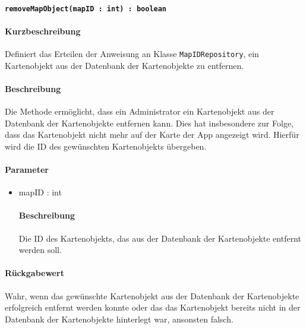 \paragraph{\texttt{removeMapObject(mapID : int) : boolean}}%
\paragraph*{Kurzbeschreibung}
Definiert das Erteilen der Anweisung an Klasse \texttt{MapIDRepository}, ein Kartenobjekt aus der Datenbank der Kartenobjekte zu entfernen.
\paragraph*{Beschreibung}
Die Methode ermöglicht, dass ein Administrator ein Kartenobjekt aus der Datenbank der Kartenobjekte entfernen kann.
Dies hat insbesondere zur Folge, dass das Kartenobjekt nicht mehr auf der Karte der App angezeigt wird.
Hierfür wird die ID des gewünschten Kartenobjekts übergeben.
\paragraph*{Parameter}
\begin{itemize}
    \item mapID : int
    		\paragraph*{Beschreibung}
    		Die ID des Kartenobjekts, das aus der Datenbank der Kartenobjekte entfernt werden soll.
\end{itemize}
\paragraph*{Rückgabewert}
Wahr, wenn das gewünschte Kartenobjekt aus der Datenbank der Kartenobjekte erfolgreich entfernt werden konnte oder das das Kartenobjekt bereits nicht in der Datenbank der Kartenobjekte hinterlegt war, ansonsten falsch.
